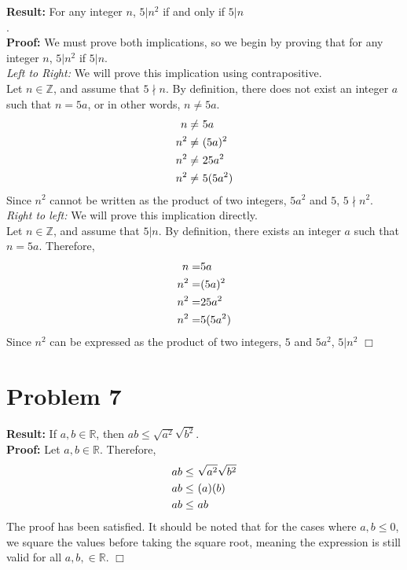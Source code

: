\documentclass[11pt]{article}
\begin{document}
    \textbf{Result:} For any integer $n$, $5 | n^2$ if and only if $ 5 | n$\\.
    \\
    \textbf{Proof:} We must prove both implications, so we begin by proving that for any integer $n$, $5 | n^2$ if $ 5 | n$. \\
    \textit{Left to Right:} We will prove this implication using contrapositive.\\
    Let $n \in \mathbb{Z}$, and assume that $5 \nmid n $. By definition, there does not exist an integer $a$ such that $n = 5a$, or in other words, $n \neq 5a$.
    \begin{align}
        n \neq& \ 5a \notag \\
        n^2 \neq& \ (5a)^2 \notag \\
        n^2 \neq& \ 25a^2 \notag \\
        n^2 \neq& \ 5(5a^2) \notag
    \end{align}
    Since $n^2$ cannot be written as the product of two integers, $5a^2$ and $5$, $5 \nmid n^2 $. \\
    \textit{Right to left:} We will prove this implication directly.\\
    Let $n \in \mathbb{Z}$, and assume that $5 | n$. By definition, there exists an integer $a$ such that $n = 5a$. Therefore,
    \begin{align}
        n =& 5a \notag\\
        n^2 =& (5a)^2 \notag\\
        n^2 =& 25a^2 \notag\\
        n^2 =& 5(5a^2)
    \end{align}
    Since $n^2$ can be expressed as the product of two integers, $5$ and $5a^2$, $5 | n^2$
    \hfill $\Box$

\newpage



\section*{Problem 7}

    \textbf{Result:} If $a, b \in \mathbb{R}$, then $ab \leq \sqrt{a^2}\sqrt{b^2}$.
    \\
    \textbf{Proof:} Let $a, b \in \mathbb{R}$. Therefore, 
    \begin{align}
        ab \leq& \ \sqrt{a^2}\sqrt{b^2} \notag \\
        ab \leq& \ (a)(b) \notag \\
        ab \leq& \ ab
    \end{align}
    The proof has been satisfied. It should be noted that for the cases where $a, b \leq 0$, we square the values before taking the square root, meaning the expression is still valid for all $a, b, \in \mathbb{R}$.
    \hfill $\Box$
\end{document}
